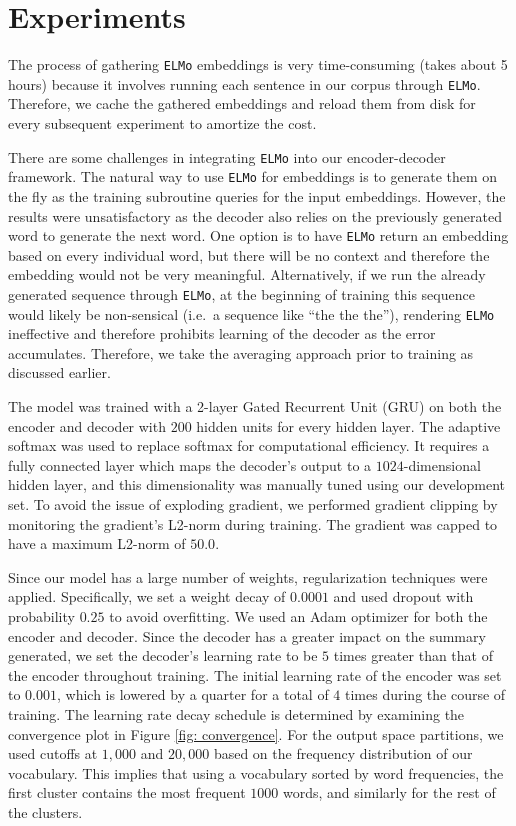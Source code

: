 \section{Experiments}
\label{sec: exp}

The process of gathering \texttt{ELMo} embeddings is very time-consuming (takes about 5 hours) because it involves running each sentence in our corpus through \texttt{ELMo}. Therefore, we cache the gathered embeddings and reload them from disk for every subsequent experiment to amortize the cost. 

There are some challenges in integrating \texttt{ELMo} into our encoder-decoder framework. The natural way to use \texttt{ELMo} for embeddings is to generate them on the fly as the training subroutine queries for the input embeddings. However, the results were unsatisfactory as the decoder also relies on the previously generated word to generate the next word. One option is to have \texttt{ELMo} return an embedding based on every individual word, but there will be no context and therefore the embedding would not be very meaningful. Alternatively, if we run the already generated sequence through \texttt{ELMo}, at the beginning of training this sequence would likely be non-sensical (i.e.\ a sequence like ``the the the''), rendering \texttt{ELMo} ineffective and therefore prohibits learning of the decoder as the error accumulates. Therefore, we take the averaging approach prior to training as discussed earlier.

The model was trained with a 2-layer Gated Recurrent Unit (GRU) on both the encoder and decoder with $200$ hidden units for every hidden layer. The adaptive softmax was used to replace softmax for computational efficiency. It requires a fully connected layer which maps the decoder's output to a $1024$-dimensional hidden layer, and this dimensionality was manually tuned using our development set. To avoid the issue of exploding gradient, we performed gradient clipping by monitoring the gradient's L2-norm during training. The gradient was capped to have a maximum L2-norm of $50.0$.

Since our model has a large number of weights, regularization techniques were applied. Specifically, we set a weight decay of $0.0001$ and used dropout with probability $0.25$ to avoid overfitting. We used an Adam optimizer \cite{kingma2014adam} for both the encoder and decoder. Since the decoder has a greater impact on the summary generated, we set the decoder's learning rate to be $5$ times greater than that of the encoder throughout training. The initial learning rate of the encoder was set to $0.001$, which is lowered by a quarter for a total of $4$ times during the course of training. The learning rate decay schedule is determined by examining the convergence plot in Figure \ref{fig: convergence}. For the output space partitions, we used cutoffs at $1,000$ and $20,000$ based on the frequency distribution of our vocabulary. This implies that using a vocabulary sorted by word frequencies, the first cluster contains the most frequent $1000$ words, and similarly for the rest of the clusters.

